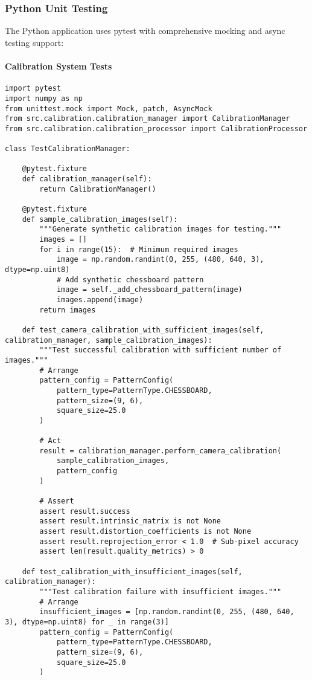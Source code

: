 \documentclass[12pt,a4paper]{article}
\begin{document}
\subsubsection{Python Unit Testing}

The Python application uses pytest with comprehensive mocking and async testing support:

\paragraph{Calibration System Tests}

\begin{verbatim}
import pytest
import numpy as np
from unittest.mock import Mock, patch, AsyncMock
from src.calibration.calibration_manager import CalibrationManager
from src.calibration.calibration_processor import CalibrationProcessor

class TestCalibrationManager:
    
    @pytest.fixture
    def calibration_manager(self):
        return CalibrationManager()
    
    @pytest.fixture
    def sample_calibration_images(self):
        """Generate synthetic calibration images for testing."""
        images = []
        for i in range(15):  # Minimum required images
            image = np.random.randint(0, 255, (480, 640, 3), dtype=np.uint8)
            # Add synthetic chessboard pattern
            image = self._add_chessboard_pattern(image)
            images.append(image)
        return images
    
    def test_camera_calibration_with_sufficient_images(self, calibration_manager, sample_calibration_images):
        """Test successful calibration with sufficient number of images."""
        # Arrange
        pattern_config = PatternConfig(
            pattern_type=PatternType.CHESSBOARD,
            pattern_size=(9, 6),
            square_size=25.0
        )
        
        # Act
        result = calibration_manager.perform_camera_calibration(
            sample_calibration_images, 
            pattern_config
        )
        
        # Assert
        assert result.success
        assert result.intrinsic_matrix is not None
        assert result.distortion_coefficients is not None
        assert result.reprojection_error < 1.0  # Sub-pixel accuracy
        assert len(result.quality_metrics) > 0
    
    def test_calibration_with_insufficient_images(self, calibration_manager):
        """Test calibration failure with insufficient images."""
        # Arrange
        insufficient_images = [np.random.randint(0, 255, (480, 640, 3), dtype=np.uint8) for _ in range(3)]
        pattern_config = PatternConfig(
            pattern_type=PatternType.CHESSBOARD,
            pattern_size=(9, 6),
            square_size=25.0
        )
        

\end{verbatim}
\end{document}
